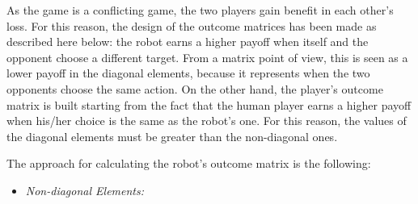 As the game is a conflicting game, the two players gain benefit in each other's loss. For this reason, the design of the outcome matrices has been made as described here below: the robot earns a higher payoff when itself and the opponent choose a different target. From a matrix point of view, this is seen as a lower payoff in the diagonal elements, because it represents when the two opponents choose the same action.
On the other hand, the player's outcome matrix is built starting from the fact that the human player earns a higher payoff when his/her choice is the same as the robot's one. For this reason, the values of the diagonal elements must be greater than the non-diagonal ones. 

The approach for calculating the robot's outcome matrix is the following:
\begin{itemize}
\item \textit{Non-diagonal Elements:}\\


\end{itemize}
